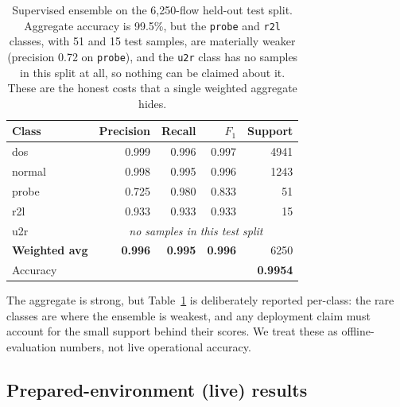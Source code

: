 \documentclass[11pt]{article}
\newcommand{\code}[1]{\texttt{#1}}
\begin{document}
\begin{table}[h]
\centering
\begin{tabular}{lrrrr}
\toprule
Class & Precision & Recall & $F_1$ & Support \\
\midrule
dos     & 0.999 & 0.996 & 0.997 & 4941 \\
normal  & 0.998 & 0.995 & 0.996 & 1243 \\
probe   & 0.725 & 0.980 & 0.833 & 51 \\
r2l     & 0.933 & 0.933 & 0.933 & 15 \\
u2r     & \multicolumn{4}{c}{\emph{no samples in this test split}} \\
\midrule
\textbf{Weighted avg} & \textbf{0.996} & \textbf{0.995} & \textbf{0.996} & 6250 \\
Accuracy & \multicolumn{4}{r}{\textbf{0.9954}} \\
\bottomrule
\end{tabular}
\caption{Supervised ensemble on the 6{,}250-flow held-out test split. Aggregate
accuracy is 99.5\%, but the \code{probe} and \code{r2l} classes, with 51 and 15
test samples, are materially weaker (precision 0.72 on \code{probe}), and the
\code{u2r} class has no samples in this split at all, so nothing can be claimed
about it. These are the honest costs that a single weighted aggregate hides.}
\label{tab:mlheld}
\end{table}

The aggregate is strong, but Table~\ref{tab:mlheld} is deliberately reported
per-class: the rare classes are where the ensemble is weakest, and any deployment
claim must account for the small support behind their scores. We treat these as
offline-evaluation numbers, not live operational accuracy.

\subsection{Prepared-environment (live) results}
\end{document}

